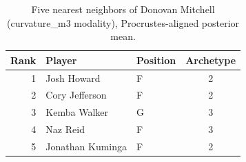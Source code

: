 \begin{table}[htbp]
  \centering\small
  \begin{tabular}{rllc}
    \toprule
    Rank & Player & Position & Archetype \\
    \midrule
    1 & Josh Howard & F & 2 \\
    2 & Cory Jefferson & F & 2 \\
    3 & Kemba Walker & G & 3 \\
    4 & Naz Reid & F & 3 \\
    5 & Jonathan Kuminga & F & 2 \\
    \bottomrule
  \end{tabular}
  \caption{Five nearest neighbors of Donovan Mitchell (curvature_m3 modality), Procrustes-aligned posterior mean.}
  \label{tab:Donovan_Mitchell_neighbors_curvature_m3}
\end{table}

